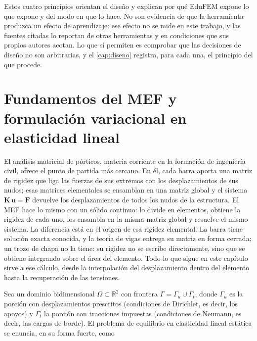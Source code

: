 Estos cuatro principios orientan el diseño y explican por qué EduFEM expone lo que expone y del modo en que lo hace. No son evidencia de que la herramienta produzca un efecto de aprendizaje: ese efecto no se mide en este trabajo, y las fuentes citadas lo reportan de otras herramientas y en condiciones que sus propios autores acotan. Lo que sí permiten es comprobar que las decisiones de diseño no son arbitrarias, y el \autoref{cap:diseno} registra, para cada una, el principio del que procede.

\section{Fundamentos del MEF y formulación variacional en elasticidad lineal}
\label{sec:formulacion-debil}

El análisis matricial de pórticos, materia corriente en la formación de ingeniería civil, ofrece el punto de partida más cercano. En él, cada barra aporta una matriz de rigidez que liga las fuerzas de sus extremos con los desplazamientos de sus nudos; esas matrices elementales se ensamblan en una matriz global y el sistema $\bm{K}\,\bm{u} = \bm{F}$ devuelve los desplazamientos de todos los nudos de la estructura. El MEF hace lo mismo con un sólido continuo: lo divide en elementos, obtiene la rigidez de cada uno, los ensambla en la misma matriz global y resuelve el mismo sistema. La diferencia está en el origen de esa rigidez elemental. La barra tiene solución exacta conocida, y la teoría de vigas entrega su matriz en forma cerrada; un trozo de chapa no la tiene: su rigidez no se escribe directamente, sino que se obtiene integrando sobre el área del elemento. Todo lo que sigue en este capítulo sirve a ese cálculo, desde la interpolación del desplazamiento dentro del elemento hasta la recuperación de las tensiones.

Sea un dominio bidimensional $\Omega \subset \mathbb{R}^2$ con frontera $\Gamma = \Gamma_u \cup \Gamma_t$, donde $\Gamma_u$ es la porción con desplazamientos prescritos (condiciones de Dirichlet, es decir, los apoyos) y $\Gamma_t$ la porción con tracciones impuestas (condiciones de Neumann, es decir, las cargas de borde). El problema de equilibrio en elasticidad lineal estática se enuncia, en su forma fuerte, como


